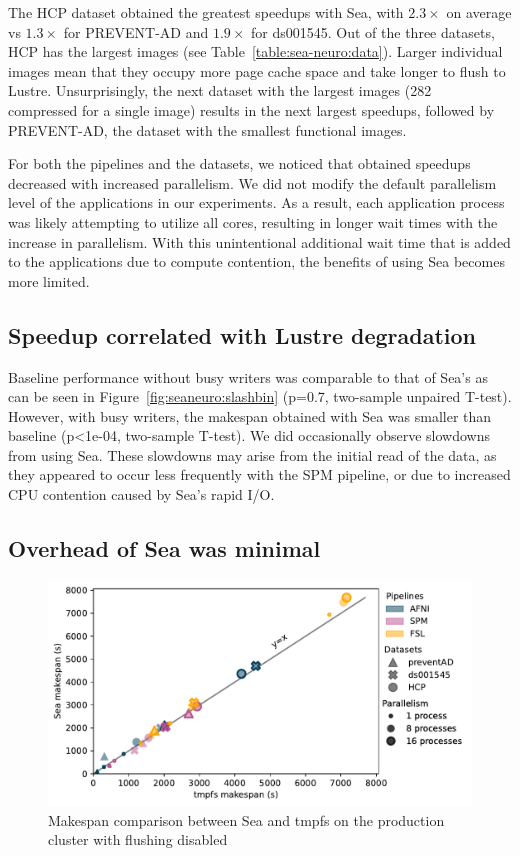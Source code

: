 \documentclass[fleqn,10pt]{wlscirep}
\begin{document}
The HCP dataset obtained the greatest speedups with
Sea, with $2.3\times$ on average vs $1.3\times$ for PREVENT-AD and $1.9\times$ for ds001545.
Out of the three datasets, HCP has the largest images (see
Table~\ref{table:sea-neuro:data}). Larger individual images mean that they
occupy more page cache space and take longer to flush to Lustre. Unsurprisingly,
the next dataset with the largest images (\SI{282}{\mebi\byte} compressed for a
single image) results in the next largest speedups, followed by PREVENT-AD, the
dataset with the smallest functional images.

For both the pipelines and the datasets, we noticed that obtained speedups
decreased with increased parallelism. We did not modify the default parallelism
level of the applications in our experiments. As a result, each application
process was likely attempting to utilize all cores, resulting in longer wait times
with the increase in parallelism. With this unintentional additional wait time that
is added to the applications due to compute contention, the benefits of using
Sea becomes more limited.


\subsection{Speedup correlated with Lustre degradation}

Baseline performance without busy writers was comparable to that of Sea's as can be seen in Figure~\ref{fig:seaneuro:slashbin} (p=0.7, two-sample unpaired T-test). However, with
busy writers, the makespan obtained with Sea was smaller than baseline (p<1e-04, two-sample T-test). We did occasionally observe slowdowns from using Sea. These slowdowns
may arise from the initial read of the data, as they appeared to occur less
frequently with the SPM pipeline, or due to increased CPU contention caused by Sea's rapid I/O.



\subsection{Overhead of Sea was minimal}


\begin{figure}
\centering
\includegraphics[width=0.7\columnwidth]{figures/beluga_sea_tmpfs.pdf}%
\caption{Makespan comparison between Sea and tmpfs on the production cluster with flushing disabled}
\label{fig:seaneuro:tmpfs}
\end{figure}
\end{document}
